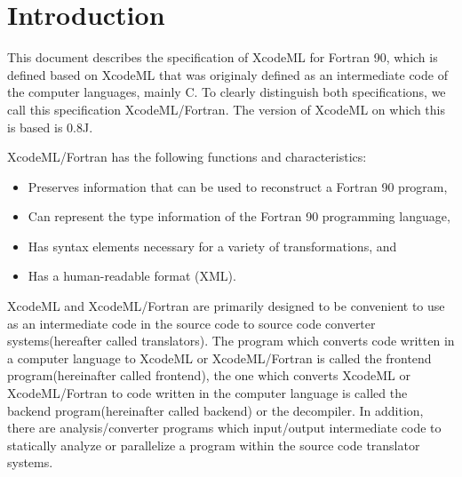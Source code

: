 \section{Introduction}


This document describes the specification of XcodeML for Fortran 90, which is defined based on XcodeML that was originaly defined as an intermediate code of the computer languages, mainly C. To clearly distinguish both specifications, we call this specification XcodeML/Fortran. The version of XcodeML on which this is based is 0.8J.


XcodeML/Fortran has the following functions and characteristics:

\begin{itemize}
\item Preserves information that can be used to reconstruct a Fortran 90 program,
\item Can represent the type information of the Fortran 90 programming language,
\item Has syntax elements necessary for a variety of transformations, and
\item Has a human-readable format (XML).
\end{itemize}

XcodeML and XcodeML/Fortran are primarily designed to be convenient to use as an intermediate code in the source code to source code converter systems(hereafter called translators). The program which converts code written in a computer language to XcodeML or XcodeML/Fortran is called the frontend program(hereinafter called frontend), the one which converts XcodeML or XcodeML/Fortran to code written in the computer language is called the backend program(hereinafter called backend) or the decompiler. In addition, there are analysis/converter programs which input/output intermediate code to statically analyze or parallelize a program within the source code translator systems.
